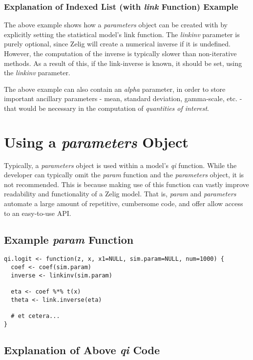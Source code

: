 \documentclass[a4paper,11pt]{article}
\begin{document}
\subsubsection{Explanation of Indexed List (with \emph{link} Function) Example}

The above example shows how a \emph{parameters} object can be created with by explicitly setting the statistical model's link function.  The \emph{linkinv} parameter is purely optional, since Zelig will create a numerical inverse if it is undefined.  However, the computation of the inverse is typically slower than non-iterative methods.  As a result of this, if the link-inverse is known, it should be set, using the \emph{linkinv} parameter.

The above example can also contain an \emph{alpha} parameter, in order to store important ancillary parameters - mean, standard deviation, gamma-scale, etc. - that would be necessary in the computation of \emph{quantities of interest}.


%
\section{Using a \emph{parameters} Object}

Typically, a \emph{parameters} object is used within a model's \emph{qi} function.  While the developer can typically omit the \emph{param} function and the \emph{parameters} object, it is not recommended.  This is because making use of this function can vastly improve readability and functionality of a Zelig model.  That is, \emph{param} and \emph{parameters} automate a large amount of repetitive, cumbersome code, and offer allow access to an easy-to-use API.

\subsection{Example \emph{param} Function}

\begin{verbatim}
qi.logit <- function(z, x, x1=NULL, sim.param=NULL, num=1000) {
  coef <- coef(sim.param)
  inverse <- linkinv(sim.param)

  eta <- coef %*% t(x)
  theta <- link.inverse(eta)

  # et cetera...
}

\end{verbatim}


\subsection{Explanation of Above \emph{qi} Code}
\end{document}
